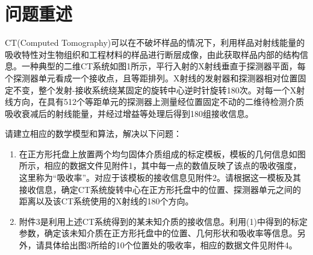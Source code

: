 \section{问题重述}

CT(Computed Tomography)可以在不破坏样品的情况下，利用样品对射线能量的吸收特性对生物组织和工程材料的样品进行断层成像，由此获取样品内部的结构信息。一种典型的二维CT系统如图1所示，平行入射的X射线垂直于探测器平面，每个探测器单元看成一个接收点，且等距排列。X射线的发射器和探测器相对位置固定不变，整个发射-接收系统绕某固定的旋转中心逆时针旋转180次。对每一个X射线方向，在具有512个等距单元的探测器上测量经位置固定不动的二维待检测介质吸收衰减后的射线能量，并经过增益等处理后得到180组接收信息。

请建立相应的数学模型和算法，解决以下问题：
\begin{enumerate}
\item 在正方形托盘上放置两个均匀固体介质组成的标定模板，模板的几何信息如图所示，相应的数据文件见附件1，其中每一点的数值反映了该点的吸收强度，这里称为“吸收率”。对应于该模板的接收信息见附件2。请根据这一模板及其接收信息，确定CT系统旋转中心在正方形托盘中的位置、探测器单元之间的距离以及该CT系统使用的X射线的180个方向。

\item 附件3是利用上述CT系统得到的某未知介质的接收信息。利用(1)中得到的标定参数，确定该未知介质在正方形托盘中的位置、几何形状和吸收率等信息。另外，请具体给出图3所给的10个位置处的吸收率，相应的数据文件见附件4。
\end{enumerate}

